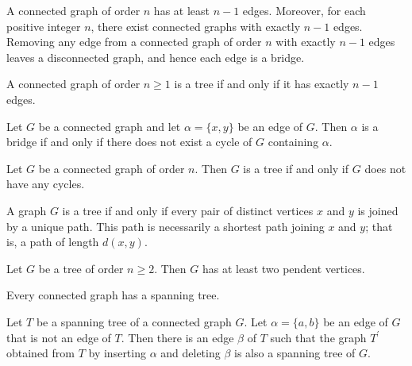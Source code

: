 \begin{theorem}
  \label{thm:11.5.1}
  A connected graph of order $n$ has at least $n - 1$ edges. Moreover, for each positive integer $n$, 
  there exist connected graphs with exactly $n - 1$ edges. Removing any edge from a connected graph 
  of order $n$ with exactly $n-1$ edges leaves a disconnected graph, and hence each edge is a bridge.
\end{theorem}

\begin{theorem}
  \label{thm:11.5.2}
  A connected graph of order $n \geq 1$ is a tree if and only if it has exactly $n - 1$ edges.
\end{theorem}

\begin{theorem}
  \label{thm:11.5.3}
  Let $G$ be a connected graph and let $\alpha = \{x,y\}$ be an edge of $G$. Then $\alpha$ is a 
  bridge if and only if there does not exist a cycle of $G$ containing $\alpha$.
\end{theorem}

\begin{theorem}
  \label{thm:11.5.4}
  Let $G$ be a connected graph of order $n$. Then $G$ is a tree if and only if $G$ does not have 
  any cycles.
\end{theorem}

\begin{theorem}
  \label{thm:11.5.5}
  A graph $G$ is a tree if and only if every pair of distinct vertices $x$ and $y$ is joined by a 
  unique path. This path is necessarily a shortest path joining $x$ and $y$; that is, a path of 
  length $d(x, y)$.
\end{theorem}

\begin{theorem}
  \label{thm:11.5.6}
  Let $G$ be a tree of order $n \geq 2$. Then $G$ has at least two pendent vertices.
\end{theorem}

\begin{theorem}
  \label{thm:11.5.7}
  Every connected graph has a spanning tree.
\end{theorem}

\begin{theorem}
  \label{thm:11.5.8}
  Let $T$ be a spanning tree of a connected graph $G$. Let $\alpha = \{a,b\}$ be an edge of $G$ that
  is not an edge of $T$. Then there is an edge $\beta$ of $T$ such that the graph $T^{\prime}$ 
  obtained from $T$ by inserting $\alpha$ and deleting $\beta$ is also a spanning tree of $G$.
\end{theorem}

